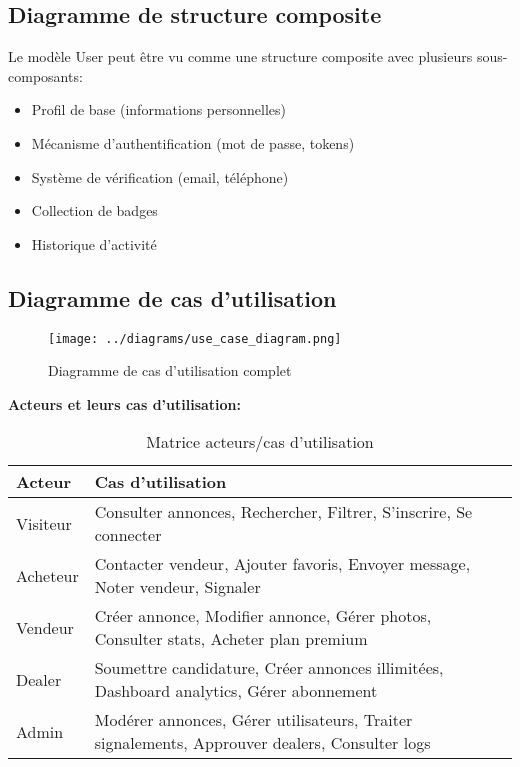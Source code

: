 \subsection{Diagramme de structure composite}

Le modèle User peut être vu comme une structure composite avec plusieurs sous-composants:
\begin{itemize}
    \item Profil de base (informations personnelles)
    \item Mécanisme d'authentification (mot de passe, tokens)
    \item Système de vérification (email, téléphone)
    \item Collection de badges
    \item Historique d'activité
\end{itemize}

\subsection{Diagramme de cas d'utilisation}

\begin{figure}[H]
\centering
\texttt{[image: ../diagrams/use\_case\_diagram.png]}
\caption{Diagramme de cas d'utilisation complet}
\label{fig:use_case}
\end{figure}

\textbf{Acteurs et leurs cas d'utilisation:}

\begin{table}[H]
\centering
\begin{tabular}{|l|p{10cm}|}
\hline
\textbf{Acteur} & \textbf{Cas d'utilisation} \\
\hline
Visiteur & Consulter annonces, Rechercher, Filtrer, S'inscrire, Se connecter \\
\hline
Acheteur & Contacter vendeur, Ajouter favoris, Envoyer message, Noter vendeur, Signaler \\
\hline
Vendeur & Créer annonce, Modifier annonce, Gérer photos, Consulter stats, Acheter plan premium \\
\hline
Dealer & Soumettre candidature, Créer annonces illimitées, Dashboard analytics, Gérer abonnement \\
\hline
Admin & Modérer annonces, Gérer utilisateurs, Traiter signalements, Approuver dealers, Consulter logs \\
\hline
\end{tabular}
\caption{Matrice acteurs/cas d'utilisation}
\end{table}

